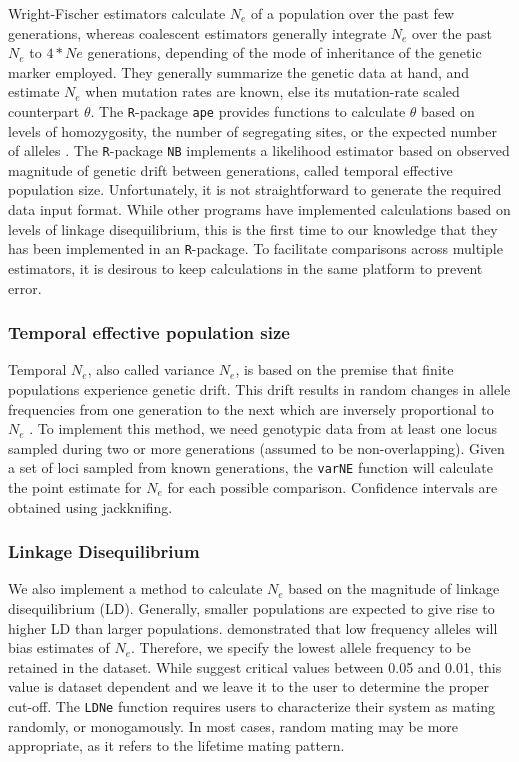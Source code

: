 \documentclass[english,titlepage]{article}
\begin{document}
Wright-Fischer estimators calculate $N_e$ of a population over the past few generations, whereas coalescent estimators generally integrate $N_e$ over the past $N_e$ to $4*Ne$ generations, depending of the mode of inheritance of the genetic marker employed. They generally summarize the genetic data at hand, and estimate $N_e$ when mutation rates are known, else its mutation-rate scaled counterpart $\theta$. The \texttt{R}-package \texttt{ape} provides functions to calculate $\theta$ based on levels of homozygosity, the number of segregating sites, or the expected number of alleles \citep{Paradis2004}. The \texttt{R}-package \texttt{NB} implements a likelihood estimator based on observed magnitude of genetic drift between generations, called temporal effective population size. Unfortunately, it is not straightforward to generate the required data input format. While other programs have implemented calculations based on levels of linkage disequilibrium, this is the first time to our knowledge that they has been implemented in an \texttt{R}-package. To facilitate comparisons across multiple estimators, it is desirous to keep calculations in the same platform to prevent error.

\subsubsection*{Temporal effective population size}

Temporal $N_e$, also called variance $N_e$, is based on the premise that finite populations experience genetic drift. This drift results in random changes in allele frequencies from one generation to the next which are inversely proportional to $N_e$ \citep{Nei1981}. To implement this method, we need genotypic data from at least one locus sampled during two or more generations (assumed to be non-overlapping).  Given a set of loci sampled from known generations, the \texttt{varNE} function will calculate the point estimate for $N_e$ for each possible comparison. Confidence intervals are obtained using jackknifing. 

\subsubsection*{Linkage Disequilibrium}

We also implement a method to calculate $N_e$ based on the magnitude of linkage disequilibrium (LD). Generally, smaller populations are expected to give rise to higher LD than larger populations. 
\cite{Waples2006} demonstrated that low frequency alleles will bias estimates of $N_e$. Therefore, we specify the lowest allele frequency to be retained in the dataset.  While \cite{Waples2008} suggest critical values between 0.05 and 0.01, this value is dataset dependent and we leave it to the user to determine the proper cut-off. The \texttt{LDNe} function requires users to characterize their system as mating randomly, or monogamously. In most cases, random mating may be more appropriate, as it refers to the lifetime mating pattern. 
\end{document}
